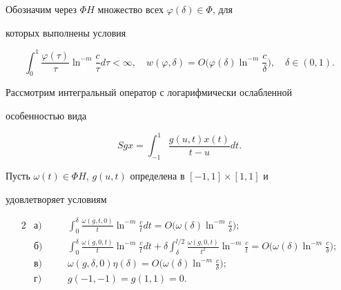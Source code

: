 Обозначим через $\Phi H$ множество всех $\varphi(\delta)\in\Phi$, для 


которых выполнены условия


$$


\int^1_0\frac{\varphi(\tau)}{\tau}\ln^{-m}


\frac{c}{\tau}d\tau<\infty,\quad w(\varphi,\delta)=O


\bigg(\varphi(\delta)\ln^{-m}\frac{c}{\delta}\bigg),\quad


\delta\in(0,1).


$$





Рассмотрим интегральный оператор с логарифмически ослабленной 


особенностью вида


\begin{equation}


S g x=\int^1_{-1}\frac{g(u,t)x(t)}{t-u}d t.


\end{equation}


Пусть $\omega(t)\in\Phi H$, $g(u,t)$ определена в $[-1,1]\times[1,1]$ и 


удовлетворяет условиям


\begin{alignat*}{2}


&\text{а)} &\quad & \int^\delta_0


\frac{\omega(g,t,0)}{t}\ln^{-m}\frac{c}{t}d t=


O\bigg(\omega(\delta)\ln^{-m}\frac{c}{\delta}\bigg);\\


%


&\text{б)} & \quad &\int^\delta_0


\frac{\omega(g,0,t)}{t}\ln^{-m}\frac{c}{t}d t+\delta


\int^{l/2}_\delta \frac{\omega(g,0,t)}{t^2}\ln^{-m}


\frac{c}{t}=O\bigg(\omega(\delta)\ln^{-m}\frac{c}{\delta}\bigg);\\


%


&\text{в)} &\quad & \omega(g,\delta,0)\eta(\delta)=O\bigg(


\omega(\delta)\ln^{-m}\frac{c}{\delta}\bigg);\\


%


&\text{г)} &\quad & g(-1,-1)=g(1,1)=0.


\end{alignat*}





